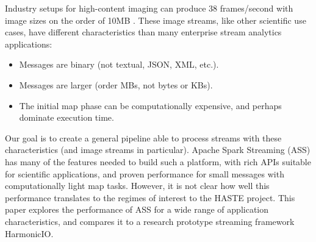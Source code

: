 \documentclass[letterpaper,conference]{IEEEtran}
\begin{document}
Industry setups for high-content imaging can produce 38 frames/second with image sizes on the order of 10MB \cite{lugnegaard2018building}. 
These image streams, like other scientific use cases, have different characteristics than many enterprise stream analytics applications: %


\begin{itemize}
\item Messages are binary (not textual, JSON, XML, etc.).
\item Messages are larger (order MBs, not bytes or KBs).
\item The initial map phase can be computationally expensive, and perhaps dominate execution time.
\end{itemize}



Our goal is to create a general pipeline able to process streams with these characteristics (and image streams in particular).
Apache Spark Streaming (ASS) has many of the features needed to build such a platform, with rich APIs suitable for scientific applications, and proven performance for small messages with computationally light map tasks. However, it is not clear how well this performance translates to the regimes of interest to the HASTE project. This paper explores the performance of ASS for a wide range of application characteristics, and compares it to a research prototype streaming framework HarmonicIO. %
\end{document}
